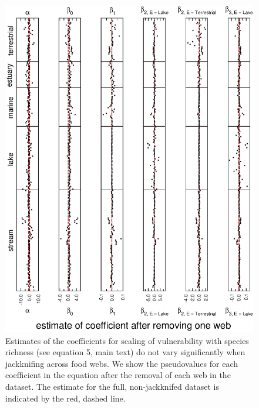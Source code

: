 \documentclass[12pt]{article}
\begin{document}
    \begin{figure}[!h]
    \centerline{\includegraphics*[height=.75\textheight]{Figures/Jackknife/Vul_web.eps}}
    \caption{Estimates of the coefficients for scaling of vulnerability with species richness
    (see equation 5, main text) do not vary significantly
    when jackknifing across food webs. We show the pseudovalues for each coefficient
    in the equation after the removal of each web in the dataset.  The estimate for the full, non-jackknifed 
    dataset is indicated by the red, dashed line.}
    \label{Vul_web}
    \end{figure}

  \newpage
\end{document}
